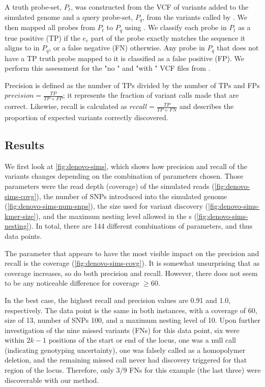 A truth probe-set, $P_t$, was constructed from the VCF of variants added to the simulated genome and a query probe-set, $P_q$, from the variants called by \pandora{}. We then mapped all probes from $P_t$ to $P_q$ using  \cite{li2013}. We classify each probe in $P_t$ as a true positive (TP) if the $e_c$ part of the probe exactly matches the sequence it aligns to in $P_q$, or a false negative (FN) otherwise. Any probe in $P_q$ that does not have a TP truth probe mapped to it is classified as a false positive (FP). We perform this assessment for the "no \denovo{}" and "with \denovo{}" VCF files from \pandora{}. 

Precision is defined as the number of TPs divided by the number of TPs and FPs $precision=\frac{TP}{TP+FP}$; it represents the fraction of variant calls made that are correct. Likewise, recall is calculated as $recall=\frac{TP}{TP+FN}$ and describes the proportion of expected variants correctly discovered.

\subsection{Results}
\label{sec:denovo-sims-results}

We first look at \autoref{fig:denovo-sims}, which shows how precision and recall of the \pandora{} \denovo{} variants changes depending on the combination of parameters chosen. Those parameters were the read depth (coverage) of the simulated reads (\autoref{fig:denovo-sims-covg}), the number of SNPs introduced into the simulated genome (\autoref{fig:denovo-sims-num-snps}), the \kmer{} size used for variant discovery (\autoref{fig:denovo-sims-kmer-size}), and the maximum nesting level allowed in the \prg{}s (\autoref{fig:denovo-sims-nesting}). In total, there are 144 different combinations of parameters, and thus data points.

The parameter that appears to have the most visible impact on the precision and recall is the coverage (\autoref{fig:denovo-sims-covg}). It is somewhat unsurprising that as coverage increases, so do both precision and recall. However, there does not seem to be any noticeable difference for coverage $\ge 60$.

In the best case, the highest recall and precision values are 0.91 and 1.0, respectively. The data point is the same in both instances, with a coverage of 60, \kmer{} size of 13, number of SNPs 100, and a maximum nesting level of 10. Upon further investigation of the nine missed variants (FNs) for this data point, six were within $2k-1$ positions of the start or end of the locus, one was a null call (indicating genotyping uncertainty), one was falsely called as a homopolymer deletion, and the remaining missed call never had \denovo{} discovery triggered for that region of the locus. Therefore, only 3/9 FNs for this example (the last three) were discoverable with our \denovo{} method.

